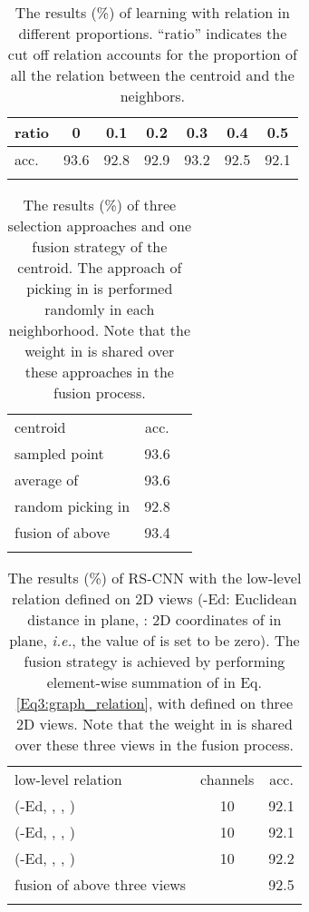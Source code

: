 \documentclass[10pt,twocolumn,letterpaper]{article}
\begin{document}
\begin{table}[t]
  \centering
\caption{The results (\%) of learning with relation in different proportions. ``ratio'' indicates the cut off relation accounts for the proportion of all the relation between the centroid and the neighbors.}
\begin{tabular}{l|cccccc}
  \Xhline{0.8pt}
  ratio & 0 & 0.1 & 0.2 & 0.3 & 0.4 & 0.5 \\
  \hline
  acc. & 93.6 & 92.8 & 92.9 & 93.2 & 92.5 & 92.1 \\
  \Xhline{0.8pt}
  \end{tabular}
  \label{Tab2:cut_relation}
  \vspace{6pt}
\end{table}

\begin{table}[t]
  \centering
\caption{The results (\%) of three selection approaches and one fusion strategy of the centroid. The approach of picking in  is performed randomly in each neighborhood. Note that the weight in  is shared over these approaches in the fusion process.}
\begin{tabular}{l|cc}
  \Xhline{0.8pt}
  centroid & acc. \\
\Xhline{0.5pt}
  sampled point  & 93.6 \\
  average of  & 93.6 \\
  random picking in  & 92.8 \\
  fusion of above & 93.4 \\
  \Xhline{0.8pt}
  \end{tabular}
  \label{Tab3:centroid}
  \vspace{6pt}
\end{table}

\begin{table}[t]
  \centering
\caption{The results (\%) of RS-CNN with the low-level relation  defined on 2D views (-Ed: Euclidean distance in  plane, : 2D coordinates of  in  plane, \textit{i.e.}, the value of  is set to be zero). The fusion strategy is achieved by performing element-wise summation of  in Eq. \eqref{Eq3:graph_relation}, with  defined on three 2D views. Note that the weight in  is shared over these three views in the fusion process.}
\begin{tabular}{lc|c}
  \Xhline{0.8pt}
  low-level relation  & channels & acc. \\
\Xhline{0.5pt}
  (-Ed, , , )  & 10 & 92.1 \\
  (-Ed, , , )  & 10 & 92.1 \\
  (-Ed, , , )  & 10 & 92.2 \\
  fusion of above three views &  & 92.5 \\
  \Xhline{0.8pt}
  \end{tabular}
  \label{Tab4:relation}
  \vspace{0pt}
\end{table}
\end{document}
